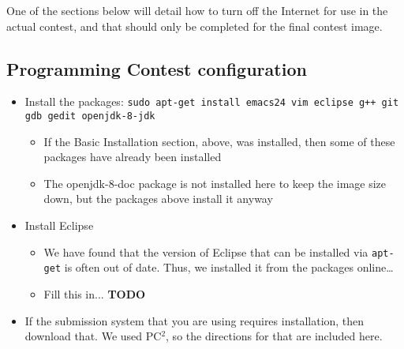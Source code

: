One of the sections below will detail how to turn off the
Internet for use in the actual contest, and that should only be
completed for the final contest image.

\subsection*{Programming Contest configuration}

\begin{itemize}

\item
  Install the packages:
  {\tt sudo apt-get install emacs24 vim eclipse g++ git gdb gedit openjdk-8-jdk}

  \begin{itemize}
  \tightlist
  \item
    If the Basic Installation section, above, was installed, then some
    of these packages have already been installed
  \item
    The openjdk-8-doc package is not installed here to keep the image
    size down, but the packages above install it anyway
  \end{itemize}

\item Install Eclipse
  \begin{itemize}
  \tightlist
\item  We have found that the version of Eclipse that can be installed via {\tt apt-get} is often out of date.  Thus, we installed it from the packages online\ldots
  \item Fill this in...  {\bf TODO}
\end{itemize}  

\item
  If the submission system that you are using requires installation, then download that.  We used PC$^2$, so the directions for that are included here.


\end{itemize}
